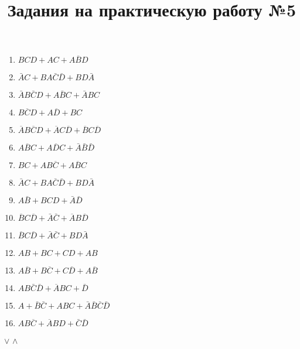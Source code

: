 \documentclass[a4paper,11pt]{article}
\title{Задания на практическую работу №5}
\date{\vspace{-10ex}}
\begin{document}
\maketitle
\begin{enumerate}
\item $BCD+AC+A\overline{B}D$
\item $\bar{A}C+BA\bar{C}\bar{D}+BD\bar{A}$
\item $\bar{A}B\bar{C}D+A\bar{B}C+\bar{A}BC$
\item $B\overline{C}D+A\overline{D}+BC$
\item $\overline{A}B\overline{C}D+\overline{A}C\overline{D}+\overline{B}C\overline{D}$
\item $A\overline{B}C+A\overline{D}C+\bar{A}\bar{B}\bar{D}$
\item $BC+AB\overline{C}+A\overline{B}C$
\item $\bar{A}C+BA\bar{C}\bar{D}+BD\bar{A}$
\item $A\bar{B} + BCD + \bar{A}\bar{D}$

\item $\overline{B}C\overline{D} + \bar{A}\bar{C} + \overline{A}B\overline{D}$
\item $\overline{B}C\overline{D} + \bar{A}\bar{C} + BD\bar{A}$
\item $AB + BC + CD + AB$
\item $A\overline{B} + B\overline{C} + C\overline{D} + A\overline{B}$

\item $AB\bar{C}\bar{D} + \overline{A}BC + \bar{D}$
\item $A + \bar{B}\bar{C} + ABC + \bar{A}\bar{B}\bar{C}\bar{D}$
\item $AB\overline{C} + \overline{A}BD + \bar{C}\bar{D}$
\end{enumerate}
$\vee$ $\wedge$
\end{document}
